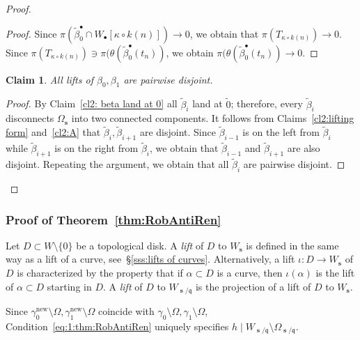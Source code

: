 \documentclass[]{amsart}
\newcommand\seq{{\operatorname{\mathbf s}}}
\newcommand\oseq{{\bullet}}
\renewcommand{\qq}{\mathfrak{q}}
\newcommand\inn{{\Omega}}
\newcommand\wbeta{{\widetilde \beta}}
\newcommand\new{{\operatorname{new}}}
\newtheorem{claim2}{Claim}
\theoremstyle{remark}
\numberwithin{equation}{section}
\theoremstyle{definition}
\begin{document}
\begin{proof}
\begin{proof}
Since $\pi(\wbeta_0^\oseq\cap  W_\oseq[\kappa\circ k(n)])\to 0$, we obtain that $\pi(T_{\kappa\circ k(n)})\to 0$. Since ${\pi(T_{\kappa\circ k(n)})\ni \pi(\theta(\wbeta^{\oseq}_0(t_n))}$, we obtain  $\pi(\theta(\wbeta^{\oseq}_0(t_n))\to 0$.
\end{proof}


\begin{claim2}
All lifts of  $\beta_0,\beta_1$ are pairwise disjoint. 
\end{claim2}
\begin{proof}
By Claim~\ref{cl2: beta land at 0} all  $\widetilde \beta_i$ land at $\widetilde 0$; therefore, every $\widetilde \beta_i$ disconnects $\inn_\seq$ into two connected components. It follows from Claims~\ref{cl2:lifting form} and~\ref{cl2:A} that  $\widetilde \beta_{i}, \widetilde \beta_{i+1}$ are disjoint. Since $\wbeta_{i-1}$ is on the left from  $\wbeta_{i}$ while $\wbeta_{i+1}$ is on the right from  $\wbeta_{i}$, we obtain that $\wbeta_{i-1}$ and $\wbeta_{i+1}$ are also disjoint.  Repeating the argument, we obtain that all $\widetilde \beta_{i}$ are pairwise disjoint.
\end{proof}



\end{proof}







\subsubsection{Proof of Theorem~\ref{thm:RobAntiRen}}

Let $D\subset W\setminus \{0\}$ be a topological disk. A \emph{lift} of $D$ to $W_\seq$ is defined in the same way as a lift of a curve, see~\S\ref{sss:lifts of curves}. Alternatively, a lift $\iota\colon D\to W_\seq$ of $D$ is characterized by the property that if $\alpha\subset D$ is a curve, then $\iota(\alpha)$ is the lift of $\alpha\subset D$ starting in $D$. A \emph{lift} of $D$ to $W_{\seq/\qq}$ is the projection of a lift of $D$ to $W_\seq$. 

Since ${\gamma^\new_0\setminus \inn},{\gamma^\new_1\setminus \inn}$ coincide with $\gamma_0\setminus \inn,\gamma_1\setminus \inn$, Condition~\eqref{eq:1:thm:RobAntiRen} uniquely specifies $h\mid W_{\seq/\qq}\setminus\inn_{\seq/\qq}$. 
\end{document}
